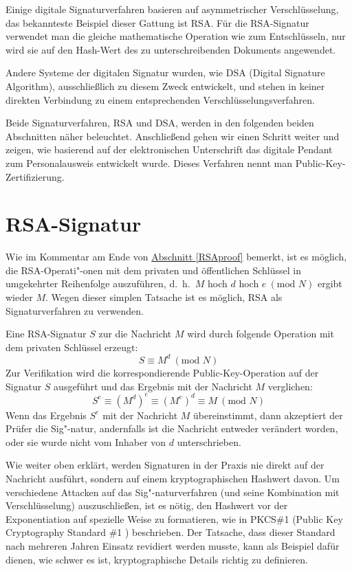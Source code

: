 \begin{refsegment}
Einige digitale Signaturverfahren basieren auf asymmetrischer
Verschlüsselung, das bekannteste Beispiel dieser Gattung ist RSA. Für die
RSA-Signatur verwendet man die gleiche mathematische Operation wie zum
Entschlüsseln, nur wird sie auf den Hash-Wert des zu unterschreibenden
Dokuments angewendet.

Andere Systeme der digitalen Signatur wurden, wie DSA (Digital Signature
Algorithm), ausschließlich zu diesem Zweck entwickelt, und stehen in
keiner direkten Verbindung zu einem entsprechenden
Verschlüsselungsverfahren.

Beide Signaturverfahren, RSA und DSA, werden in den folgenden beiden
Abschnitten näher beleuchtet. Anschließend gehen wir einen Schritt weiter
und zeigen, wie basierend auf der elektronischen Unterschrift das digitale
Pendant zum Personalausweis entwickelt wurde. Dieses Verfahren nennt man
Public-Key-Zertifizierung.


\section{RSA-Signatur}

\def\Mod#1{\ (\mbox{mod }#1)}

Wie im Kommentar am Ende von \hyperlink{RSAproof}{Abschnitt
\ref{RSAproof}} bemerkt, ist es möglich, die RSA-Operati"-onen mit dem
privaten und öffentlichen Schlüssel in umgekehrter Reihenfolge auszuführen,
d.~h.\ $M$ hoch $d$ hoch $e \Mod{N}$ ergibt wieder $M$. Wegen dieser
simplen Tatsache ist es möglich, RSA als Signaturverfahren zu
verwenden.

Eine RSA-Signatur $S$ zur die Nachricht $M$ wird durch folgende Operation
mit dem privaten Schlüssel erzeugt:
$$ S \equiv M^d \Mod{N} $$
Zur Verifikation wird die korrespondierende Public-Key-Operation auf der
Signatur $S$ ausgeführt und das Ergebnis mit der Nachricht $M$ verglichen:
$$
S^e \equiv (M^d)^e \equiv (M^e)^d \equiv M \Mod{N}$$
Wenn das Ergebnis
$S^e$ mit der Nachricht $M$ übereinstimmt, dann akzeptiert der Prüfer die
Sig"-natur, andernfalls ist die Nachricht entweder verändert worden, oder
sie wurde nicht vom Inhaber von $d$ unterschrieben.

Wie weiter oben erklärt, werden Signaturen in der Praxis nie direkt auf der
Nachricht ausführt, sondern auf einem kryptographischen Hashwert davon. Um
verschiedene Attacken auf das Sig"-naturverfahren (und seine Kombination mit
Verschlüsselung) auszuschließen, ist es nötig, den Hashwert vor der
Exponentiation auf spezielle Weise zu formatieren, wie in PKCS\#1 (Public
Key Cryptography Standard \#1 \cite{PKCS1_2002}) beschrieben.
Der Tatsache, dass
dieser Standard nach mehreren Jahren Einsatz revidiert werden musste, kann
als Beispiel dafür dienen, wie schwer es ist, kryptographische Details
richtig zu definieren.



\end{refsegment}
